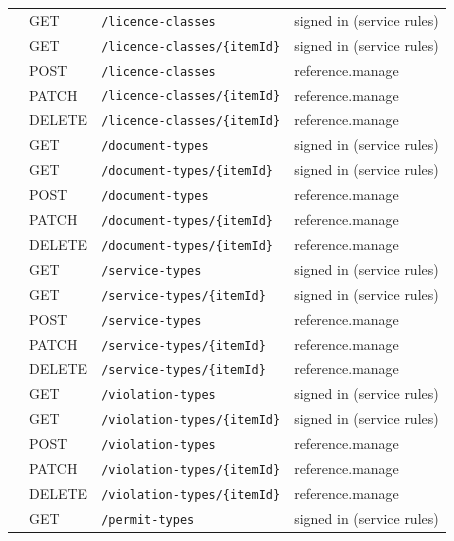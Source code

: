 \begin{longtable}{@{}p{2.1cm}l p{6.6cm} p{3.2cm}@{}}
 & GET & \texttt{/\allowbreak{}licence-classes} & signed in (service rules) \\
 & GET & \texttt{/\allowbreak{}licence-classes/\allowbreak{}\{itemId\}} & signed in (service rules) \\
 & POST & \texttt{/\allowbreak{}licence-classes} & reference.manage \\
 & PATCH & \texttt{/\allowbreak{}licence-classes/\allowbreak{}\{itemId\}} & reference.manage \\
 & DELETE & \texttt{/\allowbreak{}licence-classes/\allowbreak{}\{itemId\}} & reference.manage \\
 & GET & \texttt{/\allowbreak{}document-types} & signed in (service rules) \\
 & GET & \texttt{/\allowbreak{}document-types/\allowbreak{}\{itemId\}} & signed in (service rules) \\
 & POST & \texttt{/\allowbreak{}document-types} & reference.manage \\
 & PATCH & \texttt{/\allowbreak{}document-types/\allowbreak{}\{itemId\}} & reference.manage \\
 & DELETE & \texttt{/\allowbreak{}document-types/\allowbreak{}\{itemId\}} & reference.manage \\
 & GET & \texttt{/\allowbreak{}service-types} & signed in (service rules) \\
 & GET & \texttt{/\allowbreak{}service-types/\allowbreak{}\{itemId\}} & signed in (service rules) \\
 & POST & \texttt{/\allowbreak{}service-types} & reference.manage \\
 & PATCH & \texttt{/\allowbreak{}service-types/\allowbreak{}\{itemId\}} & reference.manage \\
 & DELETE & \texttt{/\allowbreak{}service-types/\allowbreak{}\{itemId\}} & reference.manage \\
 & GET & \texttt{/\allowbreak{}violation-types} & signed in (service rules) \\
 & GET & \texttt{/\allowbreak{}violation-types/\allowbreak{}\{itemId\}} & signed in (service rules) \\
 & POST & \texttt{/\allowbreak{}violation-types} & reference.manage \\
 & PATCH & \texttt{/\allowbreak{}violation-types/\allowbreak{}\{itemId\}} & reference.manage \\
 & DELETE & \texttt{/\allowbreak{}violation-types/\allowbreak{}\{itemId\}} & reference.manage \\
 & GET & \texttt{/\allowbreak{}permit-types} & signed in (service rules) \\

\end{longtable}
